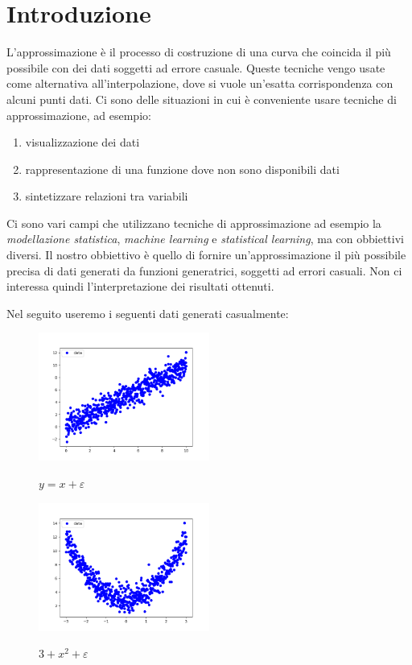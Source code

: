 \documentclass[../main.tex]{subfiles}
\begin{document}
\section{Introduzione}
L'approssimazione è il processo di costruzione di una curva che coincida il più possibile con dei  dati soggetti ad errore casuale.
Queste tecniche vengo usate come alternativa all'interpolazione, dove si vuole un'esatta corrispondenza con alcuni punti dati.
Ci sono delle situazioni in cui è conveniente usare tecniche di approssimazione, ad esempio:
\begin{enumerate}
    \item visualizzazione dei dati
    \item rappresentazione di una funzione dove non sono disponibili dati
    \item sintetizzare relazioni tra variabili
\end{enumerate}
Ci sono vari campi che utilizzano tecniche di approssimazione ad esempio la \textit{modellazione statistica}, \textit{machine learning} e 
\textit{statistical learning}, ma con obbiettivi diversi.
Il nostro obbiettivo è quello di fornire un'approssimazione il più possibile precisa di dati generati da funzioni generatrici, soggetti ad errori casuali.
Non ci interessa quindi l'interpretazione dei risultati ottenuti.

Nel seguito useremo i seguenti dati generati casualmente:

\begin{figure}[ht]
\caption{$y = x + \varepsilon$}
\includegraphics[width=0.5\textwidth]{Immagini/Introduzione/retta.png}
\centering
\label{fig:retta}
\end{figure}

\begin{figure}[ht]
\caption{$3 + x^2 + \varepsilon$}
\includegraphics[width=0.5\textwidth]{Immagini/Introduzione/parabola.png}
\centering
\label{fig:parabola}
\end{figure}
\end{document}
